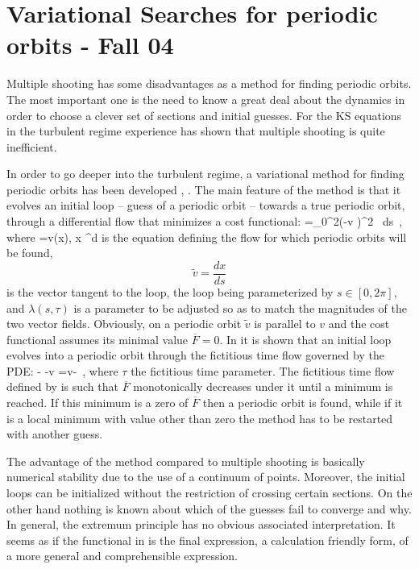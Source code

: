 \documentclass[pre,preprint,groupedaddress,showpacs,showkeys]{revtex4}
\begin{document}
\section{Variational Searches for periodic orbits - Fall 04}

Multiple shooting has some disadvantages as a method for finding
periodic orbits. The most important one is the need to know a
great deal about the dynamics in order to choose a clever set of
\Poincare sections and initial guesses. For the KS equations in
the turbulent regime experience \cite{Lan:Thesis} has shown that
multiple shooting is quite inefficient.

In order to go deeper into the turbulent regime, a variational
method for finding periodic orbits has been developed \cite{CvitLanCrete02}, \cite{lanVar1}.
The main feature of the method is that it evolves an initial loop -- guess of a periodic orbit -- towards
a true periodic orbit, through a differential flow that minimizes a cost functional:
\beq
    =\int_0^{2\pi}\left(-\lambda v \right)^2 \, ds \,,
    \label{eq:functional}
\eeq
where
\beq
    =v(x),\; x \in {}^d
    \label{eq:flow}
\eeq
is the equation defining the flow for which periodic orbits will be found,
\[
    \tilde{v}=\frac{d x}{d s}
\]
is the vector tangent to the loop, the loop being parameterized by $s \in [0,2\pi]$, and $\lambda(s,\tau)$
is a parameter to be adjusted so as to match the magnitudes of the two vector fields. Obviously,
on a periodic orbit $\tilde{v}$ is parallel to $v$ and the cost functional assumes its minimal value
$\overline{F}=0$. In \cite{CvitLanCrete02} it is shown that an initial loop evolves into a periodic
orbit through the fictitious time flow governed by the PDE:
\beq
    -\lambda {}
    -v\frac{\partial \lambda}{\partial \tau}
    =\lambda v- \,,
    \label{eq:varpde}
\eeq
where $\tau$ the fictitious time parameter. The fictitious time flow defined by  is such
that $\overline{F}$ monotonically decreases under it until a minimum is reached. If this minimum is
a zero of $\overline{F}$ then a periodic orbit is found, while if it is a local minimum with value
other than zero the method has to be restarted with another guess.

The advantage of the method compared to multiple shooting is basically numerical stability
due to the use of a continuum of points. Moreover, the initial loops can be initialized
without the restriction of crossing certain \Poincare sections. On the other hand nothing is known
about which of the guesses fail to converge and why. In general, the extremum principle has
no obvious associated interpretation. It seems as if the functional in  is the
final expression, a  calculation friendly form, of a more general and comprehensible expression.
\end{document}
